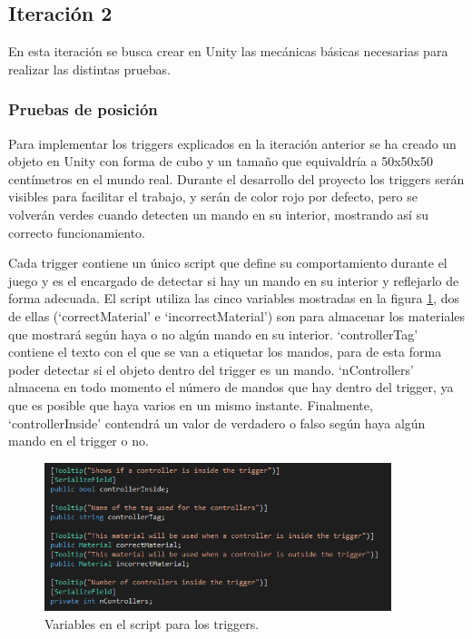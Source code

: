 

\subsection{Iteración 2}

En esta iteración se busca crear en Unity las mecánicas básicas necesarias para realizar las distintas pruebas.


\subsubsection{Pruebas de posición} 
\label{E2_triggers}

Para implementar los triggers explicados en la iteración anterior se ha creado un objeto en Unity con forma de cubo y un tamaño que equivaldría a 50x50x50 centímetros en el mundo real. Durante el desarrollo del proyecto los triggers serán visibles para facilitar el trabajo, y serán de color rojo por defecto, pero se volverán verdes cuando detecten un mando en su interior, mostrando así su correcto funcionamiento.

Cada trigger contiene un único script que define su comportamiento durante el juego y es el encargado de detectar si hay un mando en su interior y reflejarlo de forma adecuada. El script utiliza las cinco variables mostradas en la figura \ref{fig:E2_variablesTriggers}, dos de ellas (‘correctMaterial’ e ‘incorrectMaterial’) son para almacenar los materiales que mostrará según haya o no algún mando en su interior. ‘controllerTag’ contiene el texto con el que se van a etiquetar los mandos, para de esta forma poder detectar si el objeto dentro del trigger es un mando. ‘nControllers’ almacena en todo momento el número de mandos que hay dentro del trigger, ya que es posible que haya varios en un mismo instante. Finalmente, ‘controllerInside’ contendrá un valor de verdadero o falso según haya algún mando en el trigger o no.


\begin{figure}
  \centering
    \includegraphics[width=0.9\textwidth]{04.Desarrollo/02.Entrega2/02.Iteracion2_2/00.Figuras/01.variables_trigger.png}
    \caption{Variables en el script para los triggers.}
    \label{fig:E2_variablesTriggers}
\end{figure}

